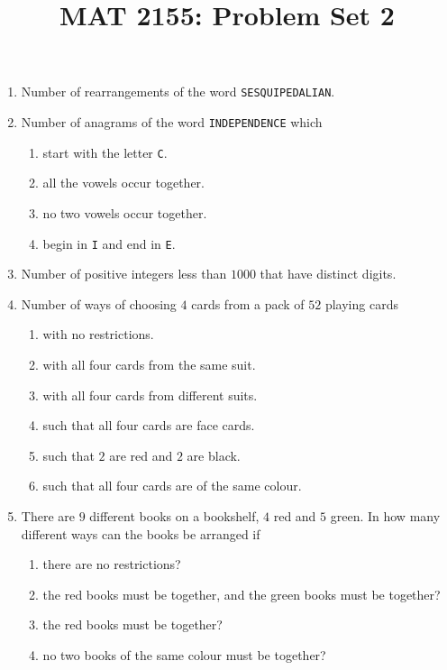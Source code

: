 \documentclass[svgnames]{amsart}
\title{MAT 2155: Problem Set 2}
\date{}
\begin{document}
\maketitle
\begin{enumerate}[leftmargin=*]
\item Number of rearrangements of the word \texttt{SESQUIPEDALIAN}.

\item Number of anagrams of the word \texttt{INDEPENDENCE} which
\begin{enumerate}[label=(\roman*)]
	\item start with the letter \texttt{C}.
	\item all the vowels occur together.
	\item no two vowels occur together.
	\item begin in \texttt{I} and end in \texttt{E}.
\end{enumerate}

\item Number of positive integers less than $1000$ that have distinct digits.

\item Number of ways of choosing $4$ cards from a pack of $52$ playing cards
\begin{enumerate}[label=(\roman*)]
	\item with no restrictions.
	\item with all four cards from the same suit.
	\item with all four cards from different suits.
	\item such that all four cards are face cards.
	\item such that $2$ are red and $2$ are black.
	\item such that all four cards are of the same colour.
\end{enumerate}

\item There are $9$ different books on a bookshelf, $4$ red and $5$ green. In how many different ways can the books be arranged if
\begin{enumerate}[label=(\roman*)]
	\item there are no restrictions?
	\item the red books must be together, and the green books must be together?
	\item the red books must be together?
	\item no two books of the same colour must be together?
\end{enumerate}


\end{enumerate}
\end{document}
